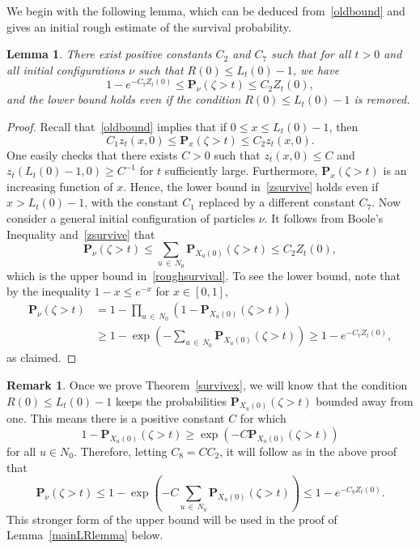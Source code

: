 \documentclass[10pt]{amsart}
\newtheorem{lemm}[theo]{Lemma}\newtheorem{prop}[theo]{Proposition}\newtheorem{coro}[theo]{Corollary}\newtheorem{conj}[theo]{Conjecture}
\theoremstyle{definition}\newtheorem{defi}[theo]{Definition}\newtheorem{rema}[theo]{Remark}\newtheorem{exam}[theo]{Example}\newtheorem{exem}[theo]{Example}\newtheorem{nota}[theo]{Notation}
\renewcommand*\P{\mathbf{P}}
\newcommand{\1} {\mathds{1}}
\begin{document}
We begin with the following lemma, which can be deduced from~\eqref{oldbound} and gives an initial rough estimate of the survival probability.

\begin{lemm}\label{survivalgen}
There exist positive constants $C_2$ and $C_7$ such that for all $t > 0$ and all initial configurations $\nu$ such that $R(0) \leq L_t(0) - 1$, we have
\begin{equation}\label{roughsurvival}
1 - e^{-C_7 Z_t(0)} \leq \P_{\nu}(\zeta > t) \leq C_2 Z_t(0),
\end{equation}
and the lower bound holds even if the condition $R(0) \leq L_t(0) - 1$ is removed.
\end{lemm}

\begin{proof}
Recall that~\eqref{oldbound} implies that if $0 \leq x \leq L_t(0) - 1$, then
\begin{equation}\label{zsurvive}
C_1 z_t(x,0) \leq \P_x(\zeta > t) \leq C_2 z_t(x,0).
\end{equation}
One easily checks that there exists $C>0$ such that $z_t(x,0) \le C$ and $z_t(L_t(0)-1,0) \ge C^{-1}$ for $t$ sufficiently large. Furthermore, $\P_x(\zeta > t)$ is an increasing function of $x$. Hence, the lower bound in~\eqref{zsurvive} holds even if $x > L_t(0) - 1$, with the constant $C_1$ replaced by a different constant $C_7$. Now consider a general initial configuration of particles $\nu$. It follows from Boole's Inequality and~\eqref{zsurvive} that
\[
\P_{\nu}(\zeta > t) \leq \sum_{u\,\in\,N_0} \P_{X_u(0)}(\zeta > t) \leq C_2 Z_t(0),
\]
which is the upper bound in~\eqref{roughsurvival}. To see the lower bound, note that by the inequality $1-x\le e^{-x}$ for $x\in [0,1]$,
\begin{align*}
\P_{\nu}(\zeta > t) &= 1 - \prod_{u\,\in\,N_0} \left(1 - \P_{X_u(0)}(\zeta > t)\right) \\
&\geq 1 - \exp \left(- \sum_{u\,\in\,N_0} \P_{X_u(0)}(\zeta > t) \right) \geq 1 - e^{-C_7Z_t(0)},
\end{align*}
as claimed.
\end{proof}

\begin{rema}
Once we prove Theorem~\ref{survivex}, we will know that the condition $R(0) \leq L_t(0) - 1$ keeps the probabilities $\P_{X_u(0)}(\zeta > t)$ bounded away from one. This means there is a positive constant $C$ for which
\[
1 - \P_{X_u(0)}(\zeta > t) \geq \exp\left(-C \P_{X_u(0)}(\zeta > t)\right)
\]
for all $u \in N_0$. Therefore, letting $C_8 = C C_2$, it will follow as in the above proof that
\begin{equation}\label{strongupper}
\P_{\nu}(\zeta > t) \leq 1 - \exp \left(- C \sum_{u\,\in\,N_0} \P_{X_u(0)}(\zeta > t) \right) \leq 1 - e^{-C_8 Z_t(0)}.
\end{equation}
This stronger form of the upper bound will be used in the proof of Lemma~\ref{mainLRlemma} below.
\end{rema}
\end{document}
